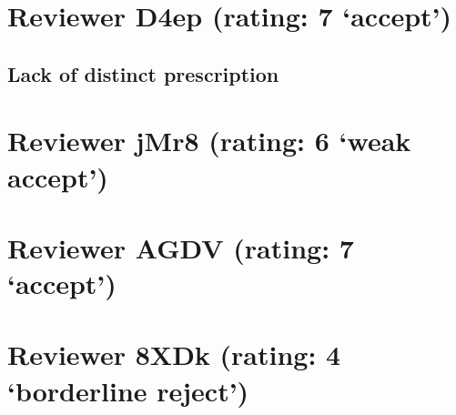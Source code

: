 \documentclass{article}
\begin{document}
\section{Reviewer D4ep (rating: 7 `accept')}

\subsection{Lack of distinct prescription}

\section{Reviewer jMr8 (rating: 6 `weak accept')}

\section{Reviewer AGDV (rating: 7 `accept')}

\section{Reviewer 8XDk (rating: 4 `borderline reject')}
\end{document}

